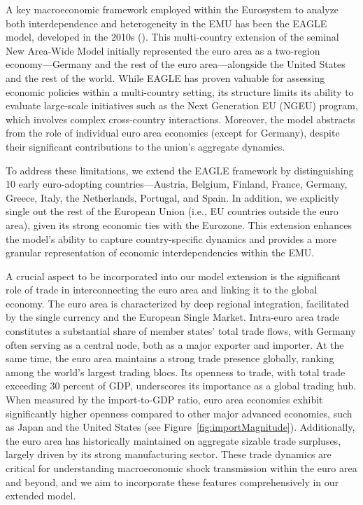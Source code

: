 \documentclass[a4paper,11pt]{article}
\numberwithin{equation}{section}
\begin{document}
A key macroeconomic framework employed within the Eurosystem to analyze both interdependence and heterogeneity in the EMU has been the EAGLE model, developed in the 2010s (\citet{GomesEtAl2010ecbwp}).
This multi-country extension of the seminal New Area-Wide Model initially represented the euro area as a two-region economy---Germany and the rest of the euro area---alongside the United States and the rest of the world.
While EAGLE has proven valuable for assessing economic policies within a multi-country setting, its structure limits its ability to evaluate large-scale initiatives such as the Next Generation EU (NGEU) program, which involves complex cross-country interactions.
Moreover, the model abstracts from the role of individual euro area economies (except for Germany), despite their significant contributions to the union's aggregate dynamics.

To address these limitations, we extend the EAGLE framework by distinguishing 10 early euro-adopting countries---Austria, Belgium, Finland, France, Germany, Greece, Italy, the Netherlands, Portugal, and Spain.
In addition, we explicitly single out the rest of the European Union (i.e., EU countries outside the euro area), given its strong economic ties with the Eurozone.
This extension enhances the model's ability to capture country-specific dynamics and provides a more granular representation of economic interdependencies within the EMU.

A crucial aspect to be incorporated into our model extension is the significant role of trade in interconnecting the euro area and linking it to the global economy.
The euro area is characterized by deep regional integration, facilitated by the single currency and the European Single Market.
Intra-euro area trade constitutes a substantial share of member states' total trade flows, with Germany often serving as a central node, both as a major exporter and importer.
At the same time, the euro area maintains a strong trade presence globally, ranking among the world's largest trading blocs.
Its openness to trade, with total trade exceeding 30 percent of GDP, underscores its importance as a global trading hub.
When measured by the import-to-GDP ratio, euro area economies exhibit significantly higher openness compared to other major advanced economies, such as Japan and the United States (see Figure~\ref{fig:importMagnitude}).
Additionally, the euro area has historically maintained on aggregate sizable trade surpluses, largely driven by its strong manufacturing sector.
These trade dynamics are critical for understanding macroeconomic shock transmission within the euro area and beyond, and we aim to incorporate these features comprehensively in our extended model.
\end{document}

